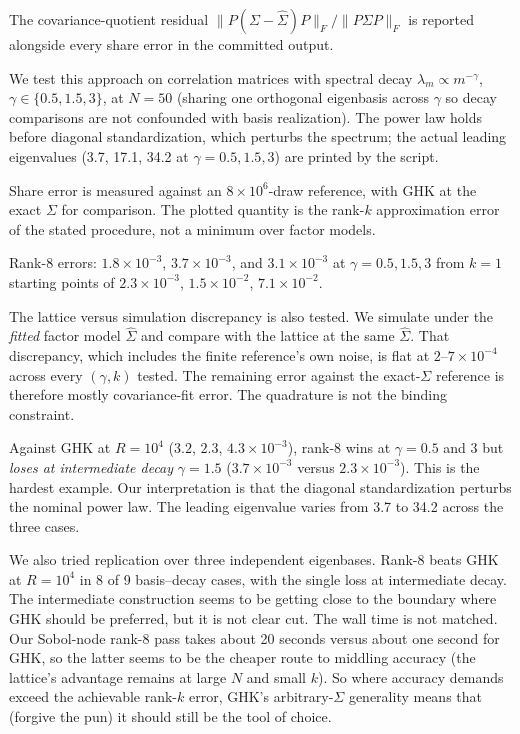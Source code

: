 \documentclass[12pt]{article}
\theoremstyle{remark}
\begin{document}
The covariance-quotient residual $\|P(\Sigma -
\hat\Sigma)P\|_F / \|P\Sigma P\|_F$ is reported alongside every share
error in the committed output.

We test this approach on correlation matrices with spectral decay
$\lambda_m \propto m^{-\gamma}$, $\gamma \in \{0.5, 1.5, 3\}$, at
$N=50$ (sharing one
orthogonal eigenbasis across $\gamma$ so decay comparisons are not
confounded with basis realization). The power law holds before diagonal
standardization, which perturbs the spectrum; the actual leading eigenvalues
(3.7, 17.1, 34.2 at $\gamma = 0.5, 1.5, 3$) are printed by the script.

Share error is measured against an $8\times10^6$-draw reference, with GHK
at the exact $\Sigma$ for comparison. The plotted quantity is the rank-$k$
approximation error of the stated procedure, not a minimum over factor
models.

Rank-8 errors: $1.8\times10^{-3}$, $3.7\times10^{-3}$, and
$3.1\times10^{-3}$ at $\gamma = 0.5, 1.5, 3$ from $k=1$ starting points of
$2.3\times10^{-3}$, $1.5\times10^{-2}$, $7.1\times10^{-2}$.

The lattice versus simulation discrepancy is also tested. We simulate
under the \emph{fitted} factor model $\hat\Sigma$ and compare with the
lattice at the same $\hat\Sigma$. That discrepancy, which includes the
finite reference's own noise, is flat at $2$--$7\times10^{-4}$ across
every $(\gamma, k)$ tested. The remaining error against the
exact-$\Sigma$ reference is therefore mostly covariance-fit error. The
quadrature is not the binding constraint. 

Against GHK at $R = 10^4$
($3.2$, $2.3$, $4.3\times10^{-3}$), rank-8 wins at $\gamma = 0.5$ and $3$
but \emph{loses at intermediate decay} $\gamma = 1.5$
($3.7\times10^{-3}$ versus $2.3\times10^{-3}$). This is the hardest example. 
Our interpretation is that the diagonal standardization 
perturbs the nominal power law. The leading eigenvalue varies from 3.7 to 34.2
across the three cases. 

We also tried replication over three independent eigenbases. Rank-8 beats GHK at $R=10^4$
in 8 of 9 basis--decay cases, with the single loss at intermediate decay.
The intermediate construction seems to be getting close to the boundary where  GHK should be preferred, but 
it is not clear cut. The wall time is not matched. Our Sobol-node
rank-8 pass takes about 20 seconds versus
about one second for GHK, so the latter seems to be the cheaper route to middling accuracy (the lattice's advantage remains at large $N$ and small
$k$). So where accuracy demands exceed the achievable rank-$k$
error, GHK's arbitrary-$\Sigma$ generality means that (forgive the pun) it should still be the tool of choice.  
\end{document}
